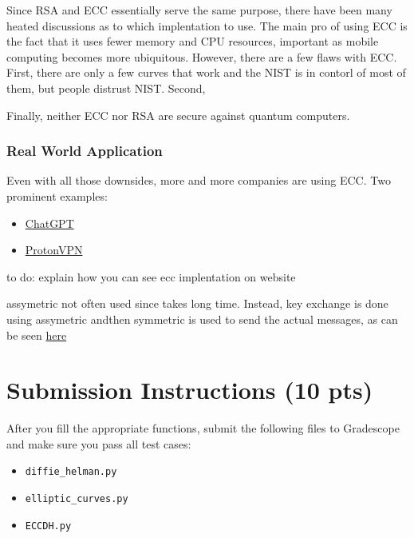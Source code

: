 \documentclass{article}
\begin{document}
    Since RSA and ECC essentially serve the same purpose, there have been many heated discussions as to which implentation to use. The main pro of using ECC is the fact that it uses fewer memory and CPU resources, important as mobile computing becomes more ubiquitous. However, there are a few flaws with ECC. First, there are only a few curves that work and the NIST is in contorl of most of them, but people distrust NIST. Second, 

    \vspace{2mm}
    Finally, neither ECC nor RSA are secure against quantum computers. 



    \subsubsection*{Real World Application}

    Even with all those downsides, more and more companies are using ECC. Two prominent examples:
    \begin{itemize}
        \item \href{https://chat.openai.com/chat}{ChatGPT}
        \item \href{https://proton.me/blog/elliptic-curve-cryptography}{ProtonVPN}
    \end{itemize}

    to do: explain how you can see ecc implentation on website

    
    assymetric not often used since takes long time. Instead, key exchange is done using assymetric andthen symmetric is used to send the actual messages, as can be seen \href{https://github.com/nakov/Practical-Cryptography-for-Developers-Book/blob/master/asymmetric-key-ciphers/ecc-encryption-decryption.md}{here}


\section*{Submission Instructions (10 pts)}
    After you fill the appropriate functions, submit the following files to Gradescope and make sure you pass all test cases:
    \begin{itemize}
        \item \lstinline{diffie_helman.py}
        \item \lstinline{elliptic_curves.py}
        \item \lstinline{ECCDH.py}
    \end{itemize}
\end{document}
